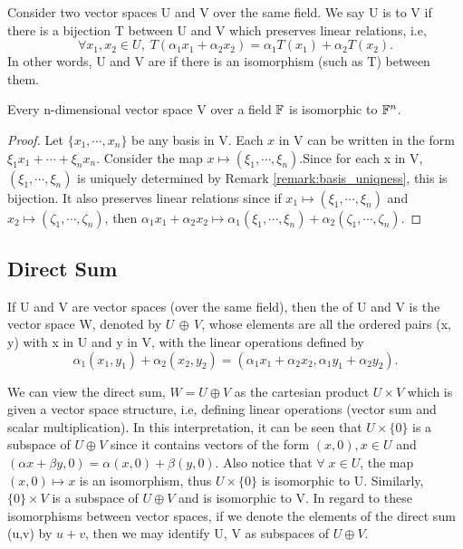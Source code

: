 \documentclass[11pt,a4paper]{article}
\begin{document}
\begin{definition}\label{def:isomorphism}
    Consider two vector spaces U and V over the same field. We say U is  to V if there is a bijection T between U and V which preserves linear relations, i.e, 
    $$\forall x_1,x_2\in U,\;T(\alpha_1 x_1+\alpha_2 x_2) = \alpha_1 T(x_1)+\alpha_2 T(x_2).
    $$
    In other words, U and V are  if there is an isomorphism (such as T) between them.
\end{definition}

\begin{theorem}\label{thm:F^n_isomorphism}
    Every n-dimensional vector space V over a field $\mathbb{F}$ is isomorphic to $\mathbb{F}^n$.
\end{theorem}

\begin{proof}
    Let $\{x_1,\cdots, x_n\}$ be any basis in V. Each $x$ in V can be written in the form $\xi_1x_1 + \cdots + \xi_nx_n$. Consider the map $x \mapsto (\xi_1,\cdots,\xi_n)$.Since for each x in V, $(\xi_1,\cdots,\xi_n)$ is uniquely determined by Remark \ref{remark:basis_uniqness}, this is bijection. It also preserves linear relations since if $x_1\mapsto (\xi_1,\cdots,\xi_n)$ and $x_2\mapsto (\zeta_1,\cdots,\zeta_n)$, then
    $
        \alpha_1 x_1+\alpha_2 x_2 \mapsto \alpha_1(\xi_1,\cdots,\xi_n)+\alpha_2(\zeta_1,\cdots,\zeta_n).
    $
\end{proof}


\subsection{Direct Sum}\label{sec:direct_sum}

\begin{definition}\label{def:direct_sum}
    If U and V are vector spaces (over the same field), then the  of U and V is the vector space W, denoted by $U\,\oplus\, V$, whose elements are all the ordered pairs (x, y) with x in U and y in V, with the linear operations defined by
    $$
    \alpha_1(x_1, y_1) + \alpha_2(x_2, y_2) = (\alpha_1x_1+\alpha_2x_2,\alpha_1y_1+\alpha_2y_2).
    $$
\end{definition}

\begin{remark}\label{note:direct_sum}
    We can view the direct sum, $W = U\oplus V$ as the cartesian product $U\times V$ which is given a vector space structure, i.e, defining linear operations (vector sum and scalar multiplication). In this interpretation, it can be seen that $U\times\{0\}$ is a subspace of $U\oplus V$ since it contains vectors of the form $(x,0),x\in U$ and $(\alpha x+\beta y,0) = \alpha(x,0)+\beta(y,0).$ Also notice that $\forall\;x\in U$, the map $(x,0)\mapsto x$ is an isomorphism, thus $U\times\{0\}$ is isomorphic to U. Similarly, $\{0\}\times V$ is a subspace of $U\oplus V$ and is isomorphic to V. In regard to these isomorphisms between vector spaces, if we denote the elements of the direct sum (u,v) by $u+v$, then we may identify U, V as subspaces of $U\oplus V$.
\end{remark}
\end{document}
